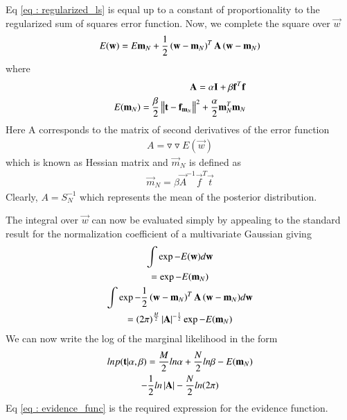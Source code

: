 \documentclass[journal,12pt,twocolumn]{IEEEtran}
\begin{document}
Eq \eqref{eq : regularized_ls} is equal up to a constant of proportionality to the regularized sum of squares error function. Now, we complete the square over $\vec{w}$
\begin{align}
    E(\mathbf{w}) = E{\mathbf{m}_{N}} + \frac{1}{2}\left(\mathbf{w} - \mathbf{m}_{N}\right)^{T}\mathbf{A}\left(\mathbf{w} - \mathbf{m}_{N}\right)
\end{align}
where 
\begin{align}
    \mathbf{A} = \alpha\mathbf{I} + \beta \mathbf{f}^T \mathbf{f}\\
    E(\mathbf{m}_{N}) = \frac{\beta}{2}\left\lVert\mathbf{t} - \mathbf{f}_{\mathbf{m}_{N}}\right\rVert^2 + \frac{\alpha}{2}\mathbf{m}_{N}^T\mathbf{m}_{N}
\end{align}
Here A corresponds to the matrix of second derivatives of the error function
\begin{align}
    A = \triangledown \triangledown E(\vec{w})
\end{align}
which is known as Hessian matrix and $\vec{m}_{N}$ is defined as
\begin{align}
    \vec{m}_{N} = \beta\vec{A}^{-1}\vec{f}^{T}\vec{t}
\end{align}
Clearly, $A = S_{N}^{-1}$ which represents the mean of the posterior distribution.

The integral over $\vec{w}$ can now be evaluated simply by appealing to the standard result for the normalization coefficient of a multivariate Gaussian giving
\begin{multline}
    \int \exp{-E(\mathbf{w})}d\mathbf{w}\\
    = \exp{-E(\mathbf{m}_{N})}\\
    \int \exp{-\frac{1}{2}\ensuremath{\left(\mathbf{w} - \mathbf{m}_{N}\right)}^{T}\mathbf{A}\ensuremath{\left(\mathbf{w} - \mathbf{m}_{N}\right)}}d\mathbf{w}\\
    = (2\pi)^{\frac{M}{2}} \left\vert\mathbf{A}\right\vert^{-\frac{1}{2}}\exp{-E(\mathbf{m}_{N})}
\end{multline}
We can now write the log of the marginal likelihood in the form
\begin{multline}
    ln p(\mathbf{t} | \alpha,\beta) = \frac{M}{2}ln \alpha + \frac{N}{2}ln \beta - E(\mathbf{m}_{N})\\
    - \frac{1}{2}ln \left\vert\mathbf{A}\right\vert - \frac{N}{2}ln(2\pi) \label{eq : evidence_func}
\end{multline}
Eq \eqref{eq : evidence_func} is the required expression for the evidence function.
\end{document}
